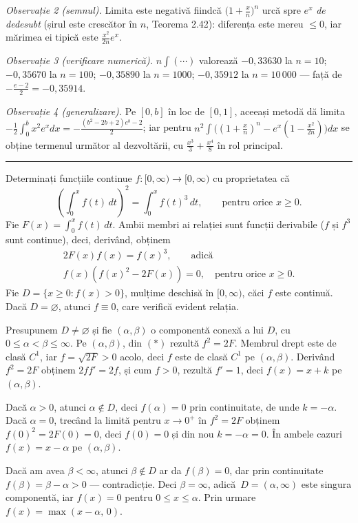 \emph{Observație 2 (semnul).} Limita este negativă fiindcă $\bigl(1+\frac xn\bigr)^{n}$ urcă spre $e^{x}$ \emph{de dedesubt} (șirul este crescător în $n$, Teorema 2.42): diferența este mereu $\le0$, iar mărimea ei tipică este $\frac{x^{2}}{2n}e^{x}$.

\emph{Observație 3 (verificare numerică).} $n\int(\cdots)$ valorează $-0{,}33630$ la $n=10$; $-0{,}35670$ la $n=100$; $-0{,}35890$ la $n=1000$; $-0{,}35912$ la $n=10\,000$ --- față de $-\frac{e-2}{2}=-0{,}35914$.

\emph{Observație 4 (generalizare).} Pe $[0,b]$ în loc de $[0,1]$, aceeași metodă dă limita $-\frac12\int_{0}^{b}x^{2}e^{x}dx=-\frac{(b^{2}-2b+2)e^{b}-2}{2}$; iar pentru $n^{2}\int\bigl((1+\frac xn)^{n}-e^{x}(1-\frac{x^{2}}{2n})\bigr)dx$ se obține termenul următor al dezvoltării, cu $\frac{x^{3}}{3}+\frac{x^{4}}{8}$ în rol principal.
\vspace{1mm}\hrule

Determinați funcțiile continue $f:[0,\infty)\to[0,\infty)$ cu proprietatea că
\[ \left(\int_0^x f(t)\,dt\right)^{\!2} = \int_0^x f(t)^3\,dt,
   \qquad \text{pentru orice } x\ge 0. \]
\sol Fie $F(x)=\int_0^x f(t)\,dt$. Ambii membri ai relației sunt funcții
derivabile ($f$ și $f^3$
sunt continue), deci, derivând, obținem
\[ \begin{gathered} 2F(x)f(x) = f(x)^3, \qquad\text{adică}\\
f(x)\left(f(x)^2 - 2F(x)\right) = 0, \quad \text{pentru orice } x\ge0. \end{gathered} \tag{$\ast$} \]
Fie $D=\{x\ge0 : f(x)>0\}$, mulțime deschisă în $[0,\infty)$, căci $f$ este
continuă. Dacă $D=\varnothing$, atunci $f\equiv0$, care verifică evident relația.

Presupunem $D\neq\varnothing$ și fie $(\alpha,\beta)$ o componentă conexă a lui
$D$, cu $0\le\alpha<\beta\le\infty$. Pe $(\alpha,\beta)$, din $(\ast)$ rezultă
$f^2 = 2F$. Membrul drept este de clasă $C^1$, iar $f=\sqrt{2F}>0$ acolo, deci $f$
este de clasă $C^1$ pe $(\alpha,\beta)$. Derivând $f^2=2F$ obținem $2ff' = 2f$, și
cum $f>0$, rezultă $f'=1$, deci $f(x)=x+k$ pe $(\alpha,\beta)$.

Dacă $\alpha>0$, atunci $\alpha\notin D$, deci $f(\alpha)=0$ prin continuitate, de
unde $k=-\alpha$. Dacă $\alpha=0$, trecând la limită pentru $x\to0^+$ în $f^2=2F$ obținem
$f(0)^2 = 2F(0)=0$, deci $f(0)=0$ și din nou $k=-\alpha=0$. În ambele
cazuri $f(x) = x-\alpha$ pe $(\alpha,\beta)$.

Dacă am avea $\beta<\infty$, atunci $\beta\notin D$ ar da $f(\beta)=0$, dar prin
continuitate $f(\beta)=\beta-\alpha>0$ --- contradicție. Deci $\beta=\infty$, adică\
$D=(\alpha,\infty)$ este singura componentă, iar $f(x)=0$ pentru
$0\le x\le\alpha$. Prin urmare $f(x)=\max(x-\alpha,\,0)$.

